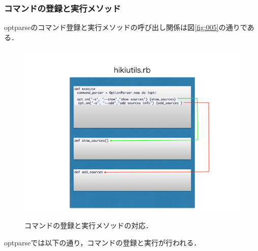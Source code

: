 \subsubsection{コマンドの登録と実行メソッド}
optparseのコマンド登録と実行メソッドの呼び出し関係は図\ref{fig:005}の通りである．

\begin{figure}[htbp]\begin{center}
\includegraphics[width=12cm,bb= 0 0 737 553]{../figs/./hikiutils_yamane.005.jpg}
\caption{コマンドの登録と実行メソッドの対応．}
\label{fig:005}
\label{default}\end{center}\end{figure}
optparseでは以下の通り，コマンドの登録と実行が行われる．

